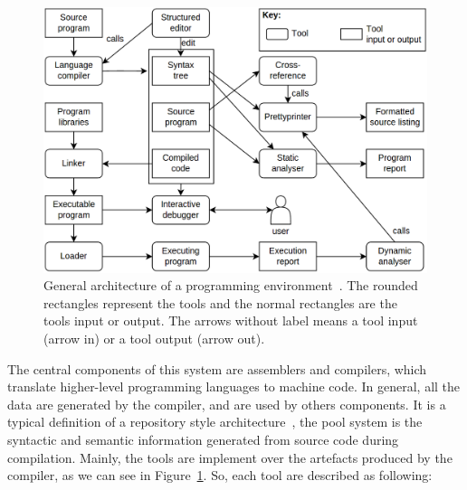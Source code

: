 \begin{figure}[h]
  \centering
  \includegraphics[scale=0.2]{img/pwb}
    \caption{General architecture of a programming environment~\cite{sommerville1996software}. The rounded rectangles represent the tools and the normal rectangles are the tools input or output. The  arrows without label means a tool input (arrow in) or a tool output (arrow out).}
  \label{fig:pwd}
\end{figure}

The central components of this system are assemblers and compilers, which translate higher-level programming languages to machine code. In general, all the data are generated by the compiler, and are used by others components. It is a typical definition of a repository style architecture~\cite[chap.~4.5]{clements2002documenting}, the pool system is the syntactic and semantic information generated from source code during compilation. Mainly, the tools are implement over the artefacts produced by the compiler, as we can see in Figure~\ref{fig:pwd}. So, each tool are described as following:

